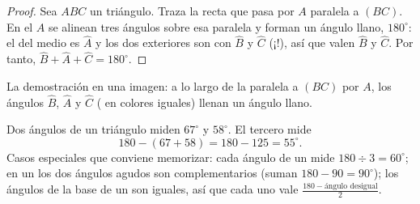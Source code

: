 \begin{proof}
Sea $ABC$ un triángulo. Traza la recta que pasa por $A$ paralela a
$(BC)$. En el  $A$ se alinean tres ángulos sobre esa paralela
y forman un ángulo llano, $180^\circ$: el del medio es
$\widehat{A}$ y los dos exteriores son  con
$\widehat B$ y $\widehat C$ (¡!), así que valen
$\widehat B$ y $\widehat C$. Por tanto,
$\widehat B + \widehat A + \widehat C = 180^\circ$.
\end{proof}

\begin{omfigure}

{\small La demostración en una imagen: a lo largo de la paralela a $(BC)$ por
$A$, los ángulos $\widehat B$, $\widehat A$ y $\widehat C$ (
en colores iguales) llenan un ángulo llano.}
\end{omfigure}

\begin{example}\label{ex:g7:triangles:sum}
Dos ángulos de un triángulo miden $67^\circ$ y $58^\circ$. El tercero
mide
\[
180 - (67 + 58) = 180 - 125 = 55^\circ .
\]
Casos especiales que conviene memorizar: cada ángulo de un 
mide $180 \div 3 = 60^\circ$; en un  los dos ángulos agudos
son complementarios (suman $180 - 90 = 90^\circ$); los ángulos
de la base de un  son iguales, así que cada uno vale
$\frac{180 - \text{ángulo desigual}}{2}$.
\end{example}


